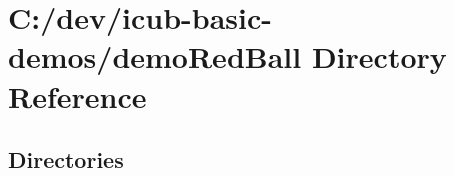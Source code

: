 \section{C\+:/dev/icub-\/basic-\/demos/demo\+Red\+Ball Directory Reference}
\label{dir_24edfe2b9091337dacb04c2225681c6a}
\subsection*{Directories}
\begin{DoxyCompactItemize}
\end{DoxyCompactItemize}
